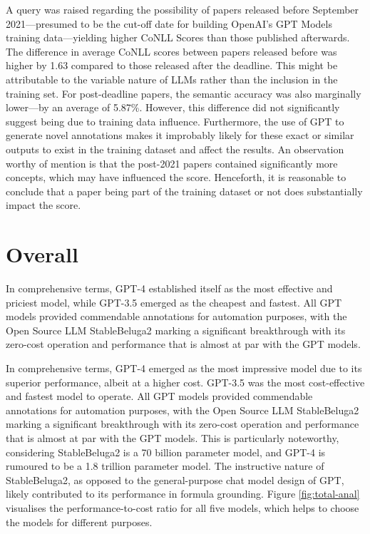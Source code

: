 A query was raised regarding the possibility of papers released before September 2021—presumed to be the cut-off date for building OpenAI's GPT Models training data—yielding higher CoNLL Scores than those published afterwards. The difference in average CoNLL scores between papers released before was higher by 1.63 compared to those released after the deadline. This might be attributable to the variable nature of LLMs rather than the inclusion in the training set. For post-deadline papers, the semantic accuracy was also marginally lower—by an average of 5.87\%. However, this difference did not significantly suggest being due to training data influence.
Furthermore, the use of GPT to generate novel annotations makes it improbably likely for these exact or similar outputs to exist in the training dataset and affect the results. An observation worthy of mention is that the post-2021 papers contained significantly more concepts, which may have influenced the score. Henceforth, it is reasonable to conclude that a paper being part of the training dataset or not does substantially impact the score.

\section{Overall}

In comprehensive terms, GPT-4 established itself as the most effective and priciest model, while GPT-3.5 emerged as the cheapest and fastest. All GPT models provided commendable annotations for automation purposes, with the Open Source LLM StableBeluga2 marking a significant breakthrough with its zero-cost operation and performance that is almost at par with the GPT models. 

In comprehensive terms, GPT-4 emerged as the most impressive model due to its superior performance, albeit at a higher cost. GPT-3.5 was the most cost-effective and fastest model to operate. All GPT models provided commendable annotations for automation purposes, with the Open Source LLM StableBeluga2 marking a significant breakthrough with its zero-cost operation and performance that is almost at par with the GPT models. This is particularly noteworthy, considering StableBeluga2 is a 70 billion parameter model, and GPT-4 is rumoured to be a 1.8 trillion parameter model. The instructive nature of StableBeluga2, as opposed to the general-purpose chat model design of GPT, likely contributed to its performance in formula grounding. Figure \ref{fig:total-anal} visualises the performance-to-cost ratio for all five models, which helps to choose the models for different purposes.

